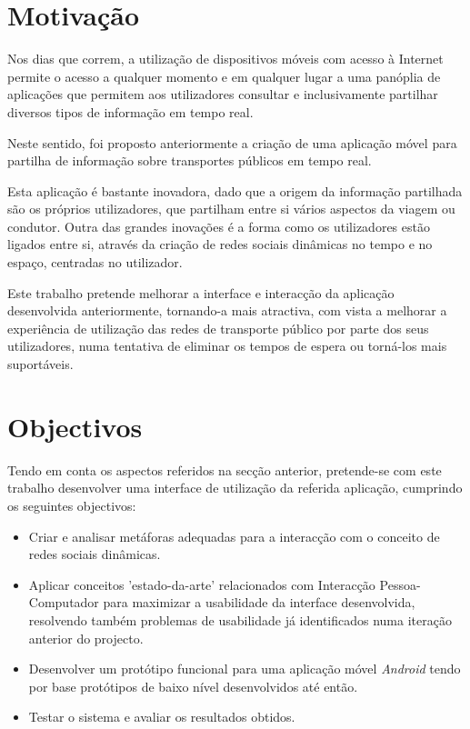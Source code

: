 \documentclass[9pt,a4paper]{extarticle}
\begin{document}
\begin{multicols}{2}

\section{Motivação}\label{sec:motiva}

Nos dias que correm, a utilização de dispositivos móveis com acesso à Internet permite o acesso a qualquer momento e em qualquer lugar a uma panóplia de aplicações que permitem aos utilizadores consultar e inclusivamente partilhar diversos tipos de informação em tempo real. 

Neste sentido, foi proposto anteriormente a criação de uma aplicação móvel para partilha de informação sobre transportes públicos em tempo real.

Esta aplicação é bastante inovadora, dado que a origem da informação partilhada são os próprios utilizadores, que partilham entre si vários aspectos da viagem ou condutor. Outra das grandes inovações é a forma como os utilizadores estão ligados entre si, através da criação de redes sociais dinâmicas no tempo e no espaço, centradas no utilizador.

Este trabalho pretende melhorar a interface e interacção da aplicação desenvolvida anteriormente, tornando-a mais atractiva, com vista a melhorar a experiência de utilização das redes de transporte público por parte dos seus utilizadores, numa tentativa de eliminar os tempos de espera ou torná-los mais suportáveis.

\section{Objectivos}\label{sec:goals}

Tendo em conta os aspectos referidos na secção anterior, pretende-se com este trabalho desenvolver uma interface de utilização da referida aplicação, cumprindo os seguintes objectivos:

\begin{itemize}
\item Criar e analisar metáforas adequadas para a interacção com o conceito de redes sociais dinâmicas.
\item Aplicar conceitos 'estado-da-arte' relacionados com Interacção Pessoa-Computador para maximizar a usabilidade da interface desenvolvida, resolvendo também problemas de usabilidade já identificados numa iteração anterior do projecto.
\item Desenvolver um protótipo funcional para uma aplicação móvel \emph{Android} tendo por base protótipos de baixo nível desenvolvidos até então.
\item Testar o sistema e avaliar os resultados obtidos.
\end{itemize}


\end{multicols}
\end{document}
